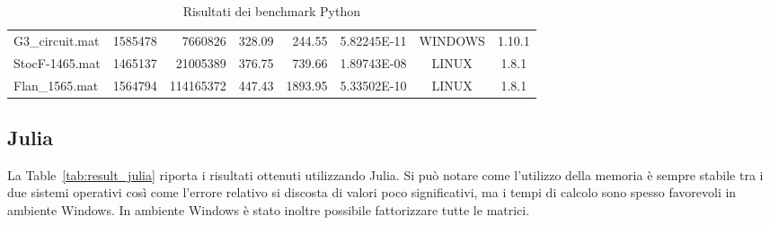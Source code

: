 \documentclass{report}
\begin{document}
\begin{table}[h]
{\begin{tabular}{@{}lrrrrrcc@{}}
                    G3\_circuit.mat     & 1585478 & 7660826   & 328.09 & 244.55  & 5.82245E-11 & WINDOWS & 1.10.1 \\
                    StocF-1465.mat      & 1465137 & 21005389  & 376.75 & 739.66  & 1.89743E-08 & LINUX   & 1.8.1  \\
                    Flan\_1565.mat      & 1564794 & 114165372 & 447.43 & 1893.95 & 5.33502E-10 & LINUX   & 1.8.1  \\ \bottomrule
                    \end{tabular}%
                    }
                    \caption{Risultati dei benchmark Python}
                    \label{tab:result_python}
                \end{table}
            
                \subsection{Julia}
                La Table~\ref{tab:result_julia} riporta i risultati ottenuti utilizzando Julia. Si può notare come
                l'utilizzo della memoria è sempre stabile tra i due sistemi operativi così come l'errore 
                relativo si discosta di valori poco significativi, ma i tempi di calcolo sono spesso favorevoli in 
                ambiente Windows. In ambiente Windows è stato inoltre possibile fattorizzare tutte le matrici.
\end{document}
